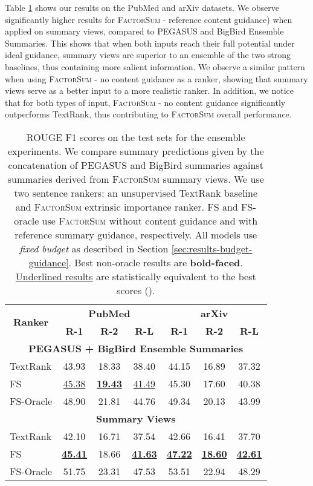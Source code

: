 \documentclass[11pt,table]{article}
\newcommand{\modelname}{FactorSum}
\begin{document}
Table \ref{tab:ablation_study} shows our results on the PubMed and arXiv datasets. We observe significantly higher results for \textsc{\modelname} - reference content guidance) when applied on summary views, compared to PEGASUS and BigBird Ensemble Summaries. This shows that when both inputs reach their full potential under ideal guidance, summary views are superior to an ensemble of the two strong baselines, thus containing more salient information. We observe a similar pattern when using \textsc{\modelname} - no content guidance as a ranker, showing that summary views serve as a better input to a more realistic ranker. In addition, we notice that for both types of input,  \textsc{\modelname} - no content guidance significantly outperforms TextRank, thus contributing to \textsc{\modelname} overall performance. 

\begin{table}
  \centering
  \setlength\tabcolsep{1.5pt}
  \begin{tabular}{l|ccc|ccc}
    \toprule
    \multicolumn{1}{c|}{\multirow{2}{1.2cm}{\centering \textbf{Ranker}}} &  \multicolumn{3}{c|}{\textbf{PubMed}} & \multicolumn{3}{c}{\textbf{arXiv}} \\
    \cmidrule(r){2-4} \cmidrule(r){5-7} & \textbf{R-1} & \textbf{R-2} & \textbf{R-L} & \textbf{R-1} & \textbf{R-2} & \textbf{R-L} \\
    \toprule
    \multicolumn{7}{c}{\textbf{PEGASUS + BigBird Ensemble Summaries}} \\
    \midrule
    TextRank & 43.93 & 18.33 & 38.40 & 44.15 & 16.89 & 37.32 \\
    \midrule
    FS & \underline{45.38} & \underline{\textbf{19.43}} & \underline{41.49} & 45.30 & 17.60 & 40.38 \\
    FS-Oracle & 48.90 & 21.81 & 44.76 & 49.34 & 20.13 & 43.99 \\
    \midrule
    \multicolumn{7}{c}{\textbf{Summary Views}} \\
    \midrule
    TextRank & 42.10 & 16.71 & 37.54 & 42.66 & 16.41 & 37.70 \\
    \midrule
    FS & \underline{\textbf{45.41}} & 18.66 & \underline{\textbf{41.63}} & \underline{\textbf{47.22}} & \underline{\textbf{18.60}} & \underline{\textbf{42.61}} \\
    FS-Oracle & 51.75 & 23.31 & 47.53 & 53.51 & 22.94 & 48.29 \\
    \bottomrule
  \end{tabular}
  \caption{ROUGE F1 scores on the test sets for the ensemble experiments. We compare summary predictions given by the concatenation of PEGASUS and BigBird summaries against summaries derived from \textsc{\modelname} summary views. We use two sentence rankers: an unsupervised TextRank baseline and \textsc{\modelname} extrinsic importance ranker. FS and FS-oracle use \textsc{\modelname} without content guidance and with reference summary guidance, respectively. All models use \emph{fixed budget} as described in Section \ref{sec:results-budget-guidance}. Best non-oracle results are \textbf{bold-faced}. \underline{Underlined results} are statistically equivalent to the best scores ().}\label{tab:ablation_study}
\end{table}
\end{document}
